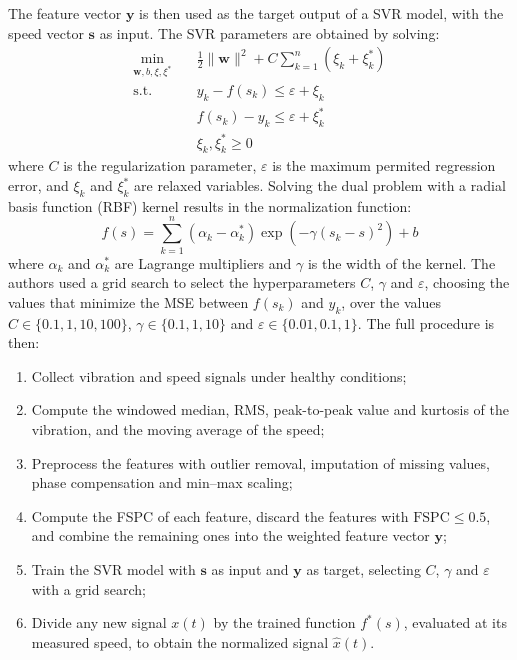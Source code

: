 The feature vector $\mathbf{y}$ is then used as the target output of a SVR model, with the speed vector $\mathbf{s}$ as input. The SVR parameters are obtained by solving:
\begin{equation}
    \begin{aligned}
        \min_{\mathbf{w}, b, \xi, \xi^*} \quad & \frac{1}{2}\|\mathbf{w}\|^2 + C \sum_{k=1}^{n} (\xi_k + \xi_k^*) \\
        \text{s.t.} \quad & y_k - f(s_k) \leq \varepsilon + \xi_k \\
        & f(s_k) - y_k \leq \varepsilon + \xi_k^* \\
        & \xi_k, \xi_k^* \geq 0
    \end{aligned}
\end{equation}
where $C$ is the regularization parameter, $\varepsilon$ is the maximum permited regression error, and $\xi_k$ and $\xi_k^*$ are relaxed variables. Solving the dual problem with a radial basis function (RBF) kernel results in the normalization function:
\begin{equation}
    f(s) = \sum_{k=1}^{n} (\alpha_k - \alpha_k^*) \exp\left(-\gamma (s_k - s)^2\right) + b
\end{equation}
where $\alpha_k$ and $\alpha_k^*$ are Lagrange multipliers and $\gamma$ is the width of the kernel. The authors used a grid search to select the hyperparameters $C$, $\gamma$ and $\varepsilon$, choosing the values that minimize the MSE between $f(s_k)$ and $y_k$, over the values $C \in \{0.1, 1, 10, 100\}$, $\gamma \in \{0.1, 1, 10\}$ and $\varepsilon \in \{0.01, 0.1, 1\}$. The full procedure is then:
\begin{enumerate}
    \item Collect vibration and speed signals under healthy conditions;
    \item Compute the windowed median, RMS, peak-to-peak value and kurtosis of the vibration, and the moving average of the speed;
    \item Preprocess the features with outlier removal, imputation of missing values, phase compensation and min--max scaling;
    \item Compute the FSPC of each feature, discard the features with $\text{FSPC} \leq 0.5$, and combine the remaining ones into the weighted feature vector $\mathbf{y}$;
    \item Train the SVR model with $\mathbf{s}$ as input and $\mathbf{y}$ as target, selecting $C$, $\gamma$ and $\varepsilon$ with a grid search;
    \item Divide any new signal $x(t)$ by the trained function $f^*(s)$, evaluated at its measured speed, to obtain the normalized signal $\hat{x}(t)$.
\end{enumerate}

